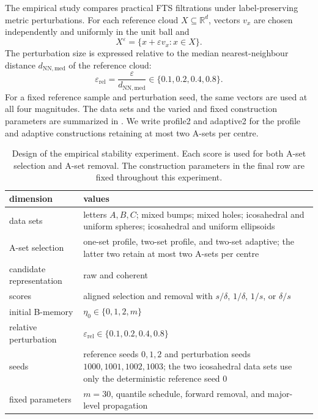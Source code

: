 \documentclass[a4paper,11pt]{article}
\theoremstyle{definition}
\theoremstyle{remark}
\begin{document}
The empirical study compares practical FTS filtrations under label-preserving metric perturbations. For each reference cloud $X\subseteq\mathbb R^d$, vectors $v_x$ are chosen independently and uniformly in the unit ball and
$$
X^\varepsilon=\{x+\varepsilon v_x\colon x\in X\}.
$$
The perturbation size is expressed relative to the median nearest-neighbour distance $d_{\mathrm{NN,med}}$ of the reference cloud:
$$
\varepsilon_{\mathrm{rel}}=\frac{\varepsilon}{d_{\mathrm{NN,med}}}
\in\{0.1,0.2,0.4,0.8\}.
$$
For a fixed reference sample and perturbation seed, the same vectors are used at all four magnitudes. The data sets and the varied and fixed construction parameters are summarized in . We write profile2 and adaptive2 for the profile and adaptive constructions retaining at most two A-sets per centre.

\begin{table}[!ht]
\centering
\small
\caption{Design of the empirical stability experiment. Each score is used for both A-set selection and A-set removal. The construction parameters in the final row are fixed throughout this experiment.}
\label{tab:stability-protocol}
\begin{tabular}{lp{}}
\toprule
dimension & values \\
\midrule
data sets & letters $A,B,C$; mixed bumps; mixed holes; icosahedral and uniform spheres; icosahedral and uniform ellipsoids \\
A-set selection & one-set profile, two-set profile, and two-set adaptive; the latter two retain at most two A-sets per centre \\
candidate representation & raw and coherent \\
scores & aligned selection and removal with $s/\delta$, $1/\delta$, $1/s$, or $\delta/s$ \\
initial B-memory & $\eta_0\in\{0,1,2,m\}$ \\
relative perturbation & $\varepsilon_{\mathrm{rel}}\in\{0.1,0.2,0.4,0.8\}$ \\
seeds & reference seeds $0,1,2$ and perturbation seeds $1000,1001,1002,1003$; the two icosahedral data sets use only the deterministic reference seed $0$ \\
fixed parameters & $m=30$, quantile schedule, forward removal, and major-level propagation \\
\bottomrule
\end{tabular}
\end{table}
\end{document}
